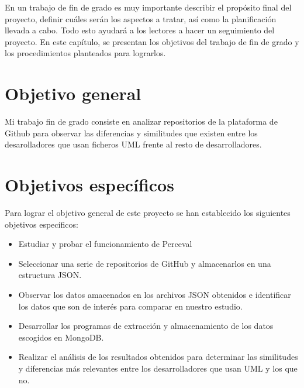 \documentclass[a4paper, 12pt]{book}
\begin{document}
En un trabajo de fin de grado es muy importante describir el propósito final del proyecto, definir cuáles serán los aspectos a tratar, así como la planificación llevada a cabo.
Todo esto ayudará a los lectores a hacer un seguimiento del proyecto. 
En este capítulo, se presentan los objetivos del trabajo de fin de grado y los procedimientos planteados para lograrlos.


\section{Objetivo general} %
\label{sec:objetivo-general} %

Mi trabajo fin de grado consiste en analizar repositorios de la plataforma de Github para observar las diferencias y similitudes que existen entre los desarolladores que usan ficheros UML frente al resto de desarrolladores.

\section{Objetivos específicos}
\label{sec:objetivos-especificos}

Para lograr el objetivo general de este proyecto se han establecido los siguientes objetivos específicos:

\begin{itemize}
  \item Estudiar y probar el funcionamiento de Perceval
  \item Seleccionar una serie de repositorios de GitHub y almacenarlos en una estructura JSON.
  \item Observar los datos amacenados en los archivos JSON obtenidos e identificar los datos que son de interés para comparar en nuestro estudio.
  \item Desarrollar los programas de extracción y almacenamiento de los datos escogidos en MongoDB.  
  \item Realizar el análisis de los resultados obtenidos para determinar las similitudes y diferencias más relevantes entre los desarrolladores que usan UML y los que no.
\end{itemize}
\end{document}
